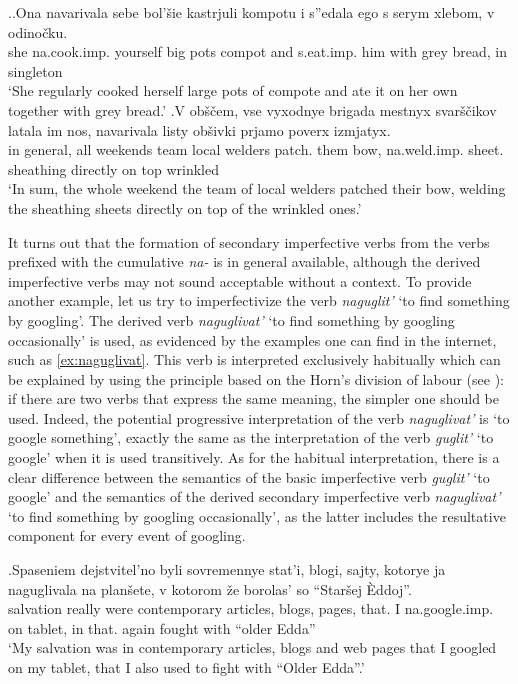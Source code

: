 \ex.\ag.\label{ex:navarivat2}Ona navarivala sebe bol'\v{s}ie kastrjuli kompotu i s''edala ego s serym xlebom, v odino\v{c}ku.\\
she na.cook.imp. yourself big pots compot and s.eat.imp. him with grey bread, in singleton\\
\trans `She regularly cooked herself large pots of compote and ate it on her own together with grey bread.'
\bg.\label{ex:navarivat1}V ob\v{s}\v{c}em, vse vyxodnye brigada mestnyx svar\v{s}\v{c}ikov latala im nos, navarivala listy ob\v{s}ivki prjamo poverx izmjatyx.\\
in general, all weekends team local welders patch. them bow, na.weld.imp. sheet. sheathing directly {on top} wrinkled\\
\trans `In sum, the whole weekend the team of local welders patched their bow, welding the sheathing sheets directly on top of the wrinkled ones.'

It turns out that the formation of secondary imperfective verbs from the verbs prefixed with the cumulative \textit{na-} is in general available, although the derived imperfective verbs may not sound acceptable without a context. To provide another example, let us try to imperfectivize the verb \textit{naguglit'} `to find something by googling'. The derived verb \textit{naguglivat'} `to find something by googling occasionally' is used, as evidenced by the examples one can find in the internet, such as \ref{ex:naguglivat}. This verb is interpreted exclusively habitually which can be explained by using the principle based on the Horn's division of labour (see \citealt{Horn:84}): if there are two verbs that express the same meaning, the simpler one should be used. Indeed, the potential progressive interpretation of the verb \textit{naguglivat'} is `to google something', exactly the same as the interpretation of the verb \textit{guglit'} `to google' when it is used transitively. As for the habitual interpretation, there is a clear difference between the semantics of the basic imperfective verb \textit{guglit'} `to google' and the semantics of the derived secondary imperfective verb \textit{naguglivat'} `to find something by googling occasionally', as the latter includes the resultative component for every event of googling. 

\exg.\label{ex:naguglivat}Spaseniem dejstvitel'no byli sovremennye stat'i, blogi, sajty, kotorye ja naguglivala na plan\v{s}ete, v kotorom \v{z}e borolas' so ``Star\v{s}ej \`{E}ddoj''.\\
salvation really were contemporary articles, blogs, pages, that. I na.google.imp. on tablet, in that. again fought with ``older Edda''\\
\trans `My salvation was in contemporary articles, blogs and web pages that I googled on my tablet, that I also used to fight with ``Older Edda''.'\\

